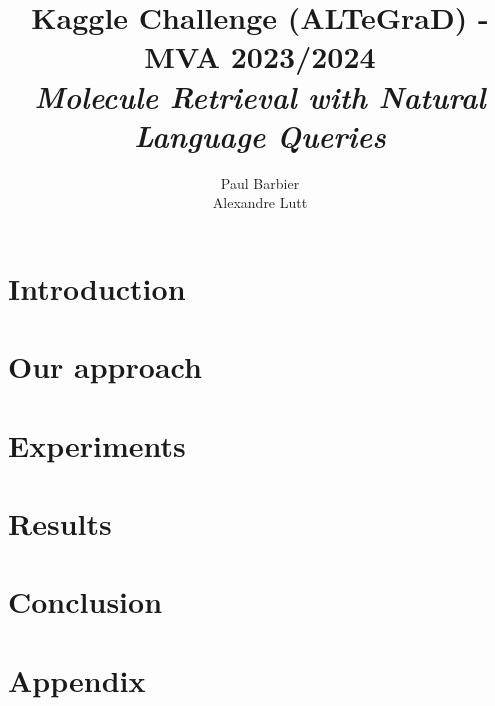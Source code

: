 \documentclass[11pt]{article}
\title{Kaggle Challenge (ALTeGraD) - MVA 2023/2024 \\ \Large{\textit{Molecule Retrieval with Natural Language Queries}}}
\author{
Paul Barbier \email{paul.barbier@eleves.enpc.fr} \\
Alexandre Lutt \email{alexandre.lutt@eleves.enpc.fr}
}
\begin{document}
\maketitle

\section{Introduction}

\paragraph{} \cite{generating_molecules}

\section{Our approach}

\paragraph{}

\section{Experiments}

\paragraph{}

\section{Results}

\paragraph{} 

\section{Conclusion}

\paragraph{} 

\newpage

{\small


}

\section{Appendix}

\paragraph{}
\end{document}
